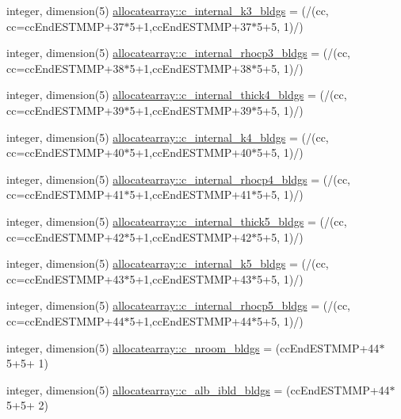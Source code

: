 \begin{DoxyCompactItemize}
\item 
integer, dimension(5) \hyperlink{namespaceallocatearray_a1eb952a71026325d2a811a547008ca14}{allocatearray\+::c\+\_\+internal\+\_\+k3\+\_\+bldgs} = (/(cc, cc=cc\+End\+E\+S\+T\+M\+MP+37$\ast$5+1,cc\+End\+E\+S\+T\+M\+MP+37$\ast$5+5, 1)/)
\item 
integer, dimension(5) \hyperlink{namespaceallocatearray_acb2bd7717c5f5c616bed1e3e845d7622}{allocatearray\+::c\+\_\+internal\+\_\+rhocp3\+\_\+bldgs} = (/(cc, cc=cc\+End\+E\+S\+T\+M\+MP+38$\ast$5+1,cc\+End\+E\+S\+T\+M\+MP+38$\ast$5+5, 1)/)
\item 
integer, dimension(5) \hyperlink{namespaceallocatearray_a896a292ac04d4a5d5bf5622279d45b16}{allocatearray\+::c\+\_\+internal\+\_\+thick4\+\_\+bldgs} = (/(cc, cc=cc\+End\+E\+S\+T\+M\+MP+39$\ast$5+1,cc\+End\+E\+S\+T\+M\+MP+39$\ast$5+5, 1)/)
\item 
integer, dimension(5) \hyperlink{namespaceallocatearray_ab282d65ad07ad23a979bed1bb5e4e688}{allocatearray\+::c\+\_\+internal\+\_\+k4\+\_\+bldgs} = (/(cc, cc=cc\+End\+E\+S\+T\+M\+MP+40$\ast$5+1,cc\+End\+E\+S\+T\+M\+MP+40$\ast$5+5, 1)/)
\item 
integer, dimension(5) \hyperlink{namespaceallocatearray_a089e481a4c0e27082406ebae70f79099}{allocatearray\+::c\+\_\+internal\+\_\+rhocp4\+\_\+bldgs} = (/(cc, cc=cc\+End\+E\+S\+T\+M\+MP+41$\ast$5+1,cc\+End\+E\+S\+T\+M\+MP+41$\ast$5+5, 1)/)
\item 
integer, dimension(5) \hyperlink{namespaceallocatearray_af4fbd7daacbc3f20dc51eae71cce01af}{allocatearray\+::c\+\_\+internal\+\_\+thick5\+\_\+bldgs} = (/(cc, cc=cc\+End\+E\+S\+T\+M\+MP+42$\ast$5+1,cc\+End\+E\+S\+T\+M\+MP+42$\ast$5+5, 1)/)
\item 
integer, dimension(5) \hyperlink{namespaceallocatearray_a929dafc0dac03e78c84c0a23d926aea8}{allocatearray\+::c\+\_\+internal\+\_\+k5\+\_\+bldgs} = (/(cc, cc=cc\+End\+E\+S\+T\+M\+MP+43$\ast$5+1,cc\+End\+E\+S\+T\+M\+MP+43$\ast$5+5, 1)/)
\item 
integer, dimension(5) \hyperlink{namespaceallocatearray_a910f0bcc144af81c13e0a44c1ed408fb}{allocatearray\+::c\+\_\+internal\+\_\+rhocp5\+\_\+bldgs} = (/(cc, cc=cc\+End\+E\+S\+T\+M\+MP+44$\ast$5+1,cc\+End\+E\+S\+T\+M\+MP+44$\ast$5+5, 1)/)
\item 
integer, dimension(5) \hyperlink{namespaceallocatearray_ab1dd7a48c1507d9047274aaa6099894a}{allocatearray\+::c\+\_\+nroom\+\_\+bldgs} = (cc\+End\+E\+S\+T\+M\+MP+44$\ast$5+5+ 1)
\item 
integer, dimension(5) \hyperlink{namespaceallocatearray_ada09598f015c239e9865188f8d58d9af}{allocatearray\+::c\+\_\+alb\+\_\+ibld\+\_\+bldgs} = (cc\+End\+E\+S\+T\+M\+MP+44$\ast$5+5+ 2)

\end{DoxyCompactItemize}
